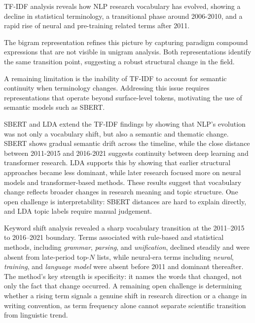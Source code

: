 TF-IDF analysis reveals how NLP research vocabulary has evolved, showing a decline in statistical terminology, a transitional phase around 2006-2010, and a rapid rise of neural and pre-training related terms after 2011.

The bigram representation refines this picture by capturing paradigm compound expressions that are not visible in unigram analysis. Both representations identify the same transition point, suggesting a robust structural change in the field.

A remaining limitation is the inability of TF-IDF to account for semantic continuity when terminology changes. Addressing this issue requires representations that operate beyond surface-level tokens, motivating the use of semantic models such as SBERT.


SBERT and LDA extend the TF-IDF findings by showing that NLP's evolution was not only a vocabulary shift, but also a semantic and thematic change. SBERT shows gradual semantic drift across the timeline, while the close distance between 2011-2015 and 2016-2021 suggests continuity between deep learning and transformer research. LDA supports this by showing that earlier structural approaches became less dominant, while later research focused more on neural models and transformer-based methods. These results suggest that vocabulary change reflects broader changes in research meaning and topic structure. One open challenge is interpretability: SBERT distances are hard to explain directly, and LDA topic labels require manual judgement.



Keyword shift analysis revealed a sharp vocabulary transition at the 2011--2015 to 2016--2021 boundary. Terms associated with rule-based and statistical methods, including \textit{grammar}, \textit{parsing}, and \textit{unification}, declined steadily and were absent from late-period top-$N$ lists, while neural-era terms including \textit{neural}, \textit{training}, and \textit{language model} were absent before 2011 and dominant thereafter. The method's key strength is specificity: it names the words that changed, not only the fact that change occurred. A remaining open challenge is determining whether a rising term signals a genuine shift in research direction or a change in writing convention, as term frequency alone cannot separate scientific transition from linguistic trend.


